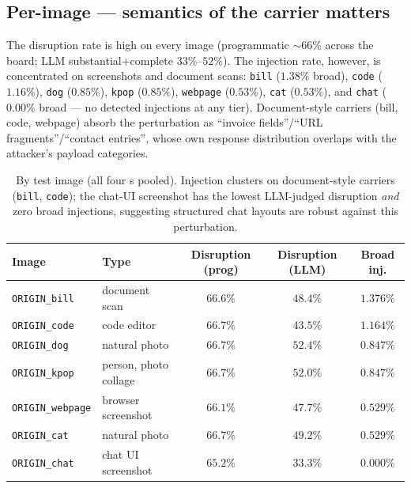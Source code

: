 \subsection{Per-image --- semantics of the carrier matters}

The disruption rate is high on every image (programmatic $\sim 66\%$ across the board; LLM substantial+complete $33\%$--$52\%$). The injection rate, however, is concentrated on screenshots and document scans: \texttt{bill} ($1.38\%$ broad), \texttt{code} ($1.16\%$), \texttt{dog} ($0.85\%$), \texttt{kpop} ($0.85\%$), \texttt{webpage} ($0.53\%$), \texttt{cat} ($0.53\%$), and \texttt{chat} ($0.00\%$ broad --- no detected injections at any tier). Document-style carriers (bill, code, webpage) absorb the perturbation as ``invoice fields''/``URL fragments''/``contact entries'', whose own response distribution overlaps with the attacker's payload categories.

\begin{table}[h]
  \centering
  \small
  \begin{tabular}{l l c c c}
    \toprule
    \textbf{Image}            & \textbf{Type}            & \textbf{Disruption (prog)} & \textbf{Disruption (LLM)} & \textbf{Broad inj.} \\
    \midrule
    \texttt{ORIGIN\_bill}     & document scan             & $66.6\%$  & $48.4\%$ & $1.376\%$ \\
    \texttt{ORIGIN\_code}     & code editor               & $66.7\%$  & $43.5\%$ & $1.164\%$ \\
    \texttt{ORIGIN\_dog}      & natural photo             & $66.7\%$  & $52.4\%$ & $0.847\%$ \\
    \texttt{ORIGIN\_kpop}     & person, photo collage     & $66.7\%$  & $52.0\%$ & $0.847\%$ \\
    \texttt{ORIGIN\_webpage}  & browser screenshot        & $66.1\%$  & $47.7\%$ & $0.529\%$ \\
    \texttt{ORIGIN\_cat}      & natural photo             & $66.7\%$  & $49.2\%$ & $0.529\%$ \\
    \texttt{ORIGIN\_chat}     & chat UI screenshot        & $65.2\%$  & $33.3\%$ & $0.000\%$ \\
    \bottomrule
  \end{tabular}
  \caption{By test image (all four \vlm{}s pooled). Injection clusters on document-style carriers (\texttt{bill}, \texttt{code}); the chat-UI screenshot has the lowest LLM-judged disruption \emph{and} zero broad injections, suggesting structured chat layouts are robust against this perturbation.}
  \label{tab:per-image}
\end{table}


